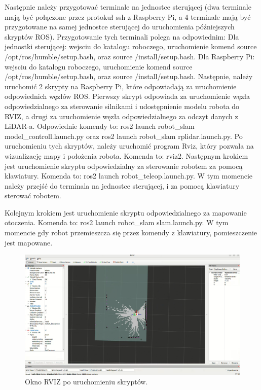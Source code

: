 \documentclass[a4paper,twoside,12pt]{book}
\begin{document}
Następnie należy przygotować terminale na jednostce sterującej (dwa terminale mają być połączone przez protokuł ssh z Raspberry Pi, a 4 terminale mają być przygotowane na samej jednostce sterującej do uruchomienia późniejszych skryptów ROS). Przygotowanie tych terminali polega na odpowiednim:
\newline
Dla jednostki sterującej: wejsciu do katalogu roboczego, uruchomienie komend source /opt/ros/humble/setup.bash, oraz source /install/setup.bash.
\newline\newline
Dla Raspberry Pi: wejsciu do katalogu roboczego, uruchomienie komend source /opt/ros/humble/setup.bash, oraz source /install/setup.bash.
\newline\newline
Następnie, należy uruchomić 2 skrypty na Raspberry Pi, które odpowiadają za uruchomienie odpowiednich węzłów ROS. Pierwszy skrypt odpowiada za uruchomienie węzła odpowiedzialnego za sterowanie silnikami i udostępnienie modelu robota do RVIZ, a drugi za uruchomienie węzła odpowiedzialnego za odczyt danych z LiDAR-a. Odpowiednie komendy to: ros2 launch robot\_slam model\_controll.launch.py oraz ros2 launch robot\_slam rplidar.launch.py.
\newline\newline
\newpage
Po uruchomieniu tych skryptów, należy uruchomić program Rviz, który pozwala na wizualizację mapy i położenia robota. Komenda to: rviz2. Następnym krokiem jest uruchomienie skryptu odpowiedzialny za sterowanie robotem za pomocą klawiatury. Komenda to: ros2 launch robot\_teleop.launch.py. W tym momencie należy przejść do terminala na jednostce sterującej, i za pomocą klawiatury sterować robotem. 
\newline

Kolejnym krokiem jest uruchomienie skryptu odpowiedzialnego za mapowanie otoczenia. Komenda to: ros2 launch robot\_slam slam.launch.py. W tym momencie gdy robot przemieszcza się przez komendy z klawiatury, pomieszczenie jest mapowane.

\begin{figure}[!hb]
	\centering
	\includegraphics[width=1\textwidth]{images/launch-map.png}
	\caption{Okno RVIZ po uruchomieniu skryptów.}
	\label{fig:launch-map}
\end{figure}
\end{document}
